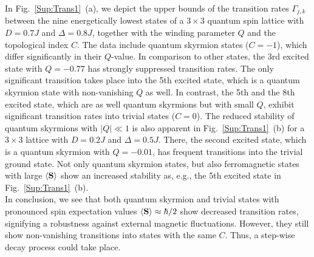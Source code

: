 \documentclass[reprint,aps,prb,superscriptaddress,10pt]{revtex4-2} %
\begin{document}
In Fig.~\ref{Sup:Trans1}~(a), we depict the upper bounds of the transition rates
$\Gamma_{j,k}$ between the nine energetically lowest states of a
$3\times3$ quantum spin lattice with $D=0.7J$ and $\Delta=0.8J$, together with the winding parameter $Q$ and the topological index
$C$.
The data include quantum skyrmion states ($C=-1$), which differ
significantly in their $Q$-value.
In comparison to other states, the 3rd excited state with $Q=-0.77$ has strongly suppressed
transition rates. The only significant
transition takes place into the 5th excited state, which is a
quantum skyrmion state with non-vanishing $Q$ as well. In contrast, the 5th and
the 8th excited state, which are as well quantum skyrmions but with small $Q$,
exhibit significant transition rates into trivial states ($C=0$).
The reduced stability of quantum skyrmions with $|Q|\ll 1$ is also
apparent in Fig.~\ref{Sup:Trans1}~(b) for a $3\times3$ lattice with
$D=0.2J$ and $\Delta=0.5J$. There, the second excited state, which is a quantum
skyrmion with $Q=-0.01$, has frequent transitions into the trivial ground
state.
Not only quantum skyrmion states, but also ferromagnetic states with large
$\braket{\textbf{S}}$ show an increased stability as, e.g., the 5th
excited state in Fig.~\ref{Sup:Trans1}~(b).\\
In conclusion, we see that both quantum skyrmion and trivial states with
pronounced spin expectation values
$\braket{\textbf{S}}\approx\hbar/2$ show decreased transition rates,
signifying a robustness against external magnetic fluctuations. However,
they still show non-vanishing transitions into states with the same $C$.
Thus, a step-wise decay process could take place.
\end{document}
